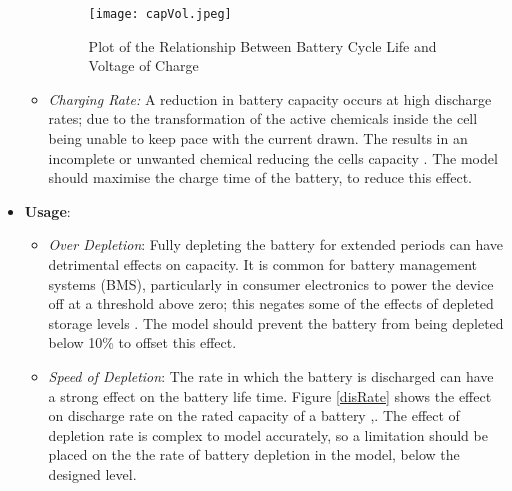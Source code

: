 \begin{itemize}
\begin{itemize}
    \begin{figure}[H]
    \centering
    \texttt{[image: capVol.jpeg]}
    \caption{Plot of the Relationship Between Battery Cycle Life and Voltage of Charge \cite{Choi2002130} }
    \label{capVol}
    \end{figure}
  \item
    \emph{Charging Rate:} A reduction in battery capacity occurs at high
    discharge rates; due to the transformation of the active chemicals
    inside the cell being unable to keep pace with the current drawn.
    The results in an incomplete or unwanted chemical reducing the cells
    capacity \cite{BatteryL10:online}. The model should maximise the
    charge time of the battery, to reduce this effect.
  \end{itemize}
\item
  \textbf{Usage}:

  \begin{itemize}
  \tightlist
  \item
    \emph{Over Depletion}: Fully depleting the battery for extended
    periods can have detrimental effects on capacity. It is common for
    battery management systems (BMS), particularly in consumer
    electronics to power the device off at a threshold above zero; this
    negates some of the effects of depleted storage levels
    \cite{Prematur82:online}. The model should prevent the battery from
    being depleted below 10\% to offset this effect.
  \item
    \emph{Speed of Depletion}: The rate in which the battery is
    discharged can have a strong effect on the battery life time. Figure
    \ref{disRate} shows the effect on discharge rate on the rated
    capacity of a battery
    \cite{BatteryL10:online},\cite{Effectso69:online}. The effect of
    depletion rate is complex to model accurately, so a limitation
    should be placed on the the rate of battery depletion in the model,
    below the designed level.


\end{itemize}
\end{itemize}
